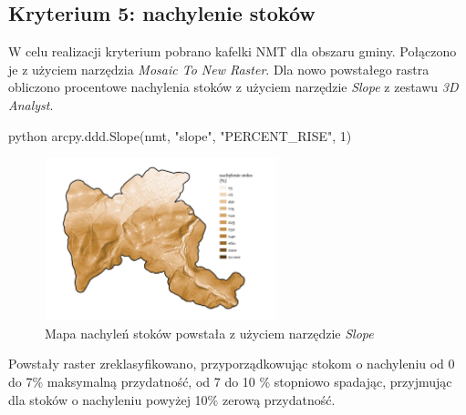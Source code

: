 \documentclass{article}
\begin{document}

\vspace{10pt}

\subsection{Kryterium 5: nachylenie stoków}
W celu realizacji kryterium pobrano kafelki NMT dla obszaru gminy. Połączono je z użyciem narzędzia \textit{Mosaic To New Raster}. Dla nowo powstałego rastra obliczono procentowe nachylenia stoków z użyciem narzędzie \textit{Slope} z zestawu \textit{3D Analyst}.
\vspace{5pt}

\begin{mintedbox}{python}
arcpy.ddd.Slope(nmt, "slope", "PERCENT_RISE", 1)
\end{mintedbox}
\vspace{10pt}

\begin{figure}[H]
    \centering
    \includegraphics[width=0.6\textwidth]{img/kryterium5-stoki.jpg}
    \caption{Mapa nachyleń stoków powstała z użyciem narzędzie \textit{Slope}}
\end{figure}

Powstały raster zreklasyfikowano, przyporządkowując stokom o nachyleniu od 0 do 7\% maksymalną przydatność, od 7 do 10 \% stopniowo spadając, przyjmując dla stoków o nachyleniu powyżej 10\% zerową przydatność.
\vspace{5pt}
\end{document}
